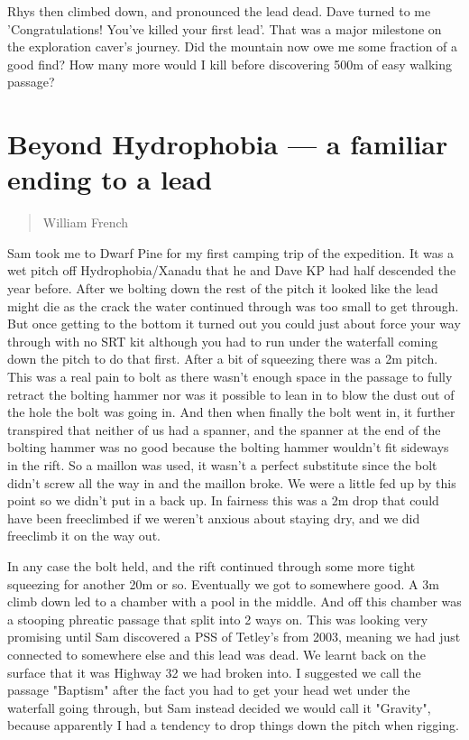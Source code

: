 \documentclass[onecolumn]{book}
\begin{document}
Rhys then climbed down, and pronounced the lead dead. Dave turned to me 'Congratulations! You've killed your first lead'. That was a major milestone on the exploration caver's journey. Did the mountain now owe me some fraction of a good find? How many more would I kill before discovering 500m of easy walking passage?

\section{Beyond Hydrophobia --- a familiar ending to a lead}
\begin{verse}
William French
\end{verse}

Sam took me to Dwarf Pine for my first camping trip of the expedition. It was a wet pitch off Hydrophobia/Xanadu that he and Dave KP had half descended the year before. After we bolting down the rest of the pitch it looked like the lead might die as the crack the water continued through was too small to get through. But once getting to the bottom it turned out you could just about force your way through with no SRT kit although you had to run under the waterfall coming down the pitch to do that first. After a bit of squeezing there was a 2m pitch. This was a real pain to bolt as there wasn't enough space in the passage to fully retract the bolting hammer nor was it possible to lean in to blow the dust out of the hole the bolt was going in. And then when finally the bolt went in, it further transpired that neither of us had a spanner, and the spanner at the end of the bolting hammer was no good because the bolting hammer wouldn't fit sideways in the rift. So a maillon was used, it wasn't a perfect substitute since the bolt didn't screw all the way in and the maillon broke. We were a little fed up by this point so we didn't put in a back up. In fairness this was a 2m drop that could have been freeclimbed if we weren't anxious about staying dry, and we did freeclimb it on the way out.

In any case the bolt held, and the rift continued through some more tight squeezing for another 20m or so. Eventually we got to somewhere good. A 3m climb down led to a chamber with a pool in the middle. And off this chamber was a stooping phreatic passage that split into 2 ways on. This was looking very promising until Sam discovered a PSS of Tetley's from 2003, meaning we had just connected to somewhere else and this lead was dead. We learnt back on the surface that it was Highway 32 we had broken into. I suggested we call the passage "Baptism" after the fact you had to get your head wet under the waterfall going through, but Sam instead decided we would call it "Gravity", because apparently I had a tendency to drop things down the pitch when rigging.
\end{document}
